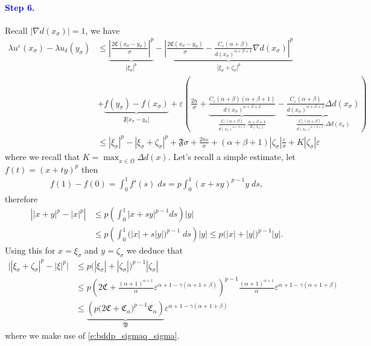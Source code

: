 \documentclass[11pt,reqno]{amsart}
\numberwithin{figure}{section}
\theoremstyle{plain}
\theoremstyle{remark}
\numberwithin{equation}{section}
\begin{document}
\paragraph{\textcolor{blue}{\textbf{Step 6.}}} Recall $|\nabla d(x_\sigma)| = 1$, we have
\begin{align}
    \lambda u^\varepsilon(x_\sigma) - \lambda u_\delta(y_\sigma) &\leq \underbrace{\left|\frac{2\mathfrak{C}(x_\sigma-y_\sigma)}{\sigma}\right|^p}_{|\xi_\sigma|^p} - \underbrace{ \left|\frac{2\mathfrak{C}(x_\sigma-y_\sigma)}{\sigma} - \frac{C_\varepsilon(\alpha+\beta)}{d(x_\sigma)^{\alpha+\beta+1}}\nabla d(x_\sigma )\right|^p}_{|\xi_\sigma+\zeta_\sigma|^p} \nonumber\\
    &+ \underbrace{f(y_\sigma) - f(x_\sigma)}_{\mathfrak{F}|x_\sigma - y_\sigma|} + \varepsilon\left(\frac{2n}{\sigma} + \underbrace{\frac{C_\varepsilon(\alpha+\beta)(\alpha+\beta+1)}{d(x_\sigma)^{\alpha+\beta+2}}}_{\frac{C_\varepsilon (\alpha+\beta)}{d(x_\sigma)^{\alpha+\beta + 1}}.\frac{\alpha+\beta+1}{d(x_\sigma)}}-\underbrace{\frac{C_\varepsilon(\alpha+\beta)}{d(x_\sigma)^{\alpha+\beta+1}}\Delta d(x_\sigma)}_{\frac{C_\varepsilon(\alpha+\beta)}{d(x_\sigma)^{\alpha+\beta+1}}.\Delta d(x_\sigma)}\right)\nonumber\\
    &\leq |\xi_\sigma|^p - |\xi_\sigma+\zeta_\sigma|^p + \mathfrak{F}\sigma + \frac{2n\varepsilon}{\sigma} + (\alpha+\beta+1)|\zeta_\sigma|\frac{\varepsilon}{\sigma} + K|\zeta_\sigma|\varepsilon \label{e:est3}
\end{align}
where we recall that $K = \max_{x\in \overline{\Omega}}\Delta d(x)$. Let's recall a simple estimate, let $f(t) = (x+ty)^p$ then
\begin{align*}
    f(1) - f(0) = \int_ 0^1 f'(s)\;ds = p\int_0^1 (x+sy)^{p-1}y\;ds,
\end{align*}
therefore
\begin{align*}
    \left||x+y|^p - |x|^p \right| &\leq p \left(\int_0^1 |x+sy|^{p-1}ds\right)|y|\\
    &\leq p\left(\int_0^1\Big(|x|+s|y|\Big)^{p-1}\;ds\right)|y| \leq  p\Big(|x|+|y|\Big)^{p-1}|y|.
\end{align*}
Using this for $x = \xi_\sigma$ and $y = \zeta_\sigma$ we deduce that
\begin{align}
    \Big||\xi_\sigma+\zeta_\sigma|^p - |\xi|^p\Big| &\leq p\Big(|\xi_\sigma|+|\zeta_\sigma|\Big)^{p-1}|\zeta_\sigma|\nonumber\\
    &\leq p\left(2\mathfrak{C} + \frac{(\alpha+1)^{\alpha+1}}{\alpha}\varepsilon^{\alpha+1 - \gamma(\alpha+1+\beta)}\right)^{p-1}\frac{(\alpha+1)^{\alpha+1}}{\alpha}\varepsilon^{\alpha+1 - \gamma(\alpha+1+\beta)}\nonumber\\
    &\leq \underbrace{\left(p\big(2\mathfrak{C} + \mathfrak{C}_\alpha\big)^{p-1} \mathfrak{C}_\alpha \right)}_{\mathfrak{B}}\varepsilon^{\alpha+1 - \gamma(\alpha+1+\beta)} \label{e:est2}
\end{align}
where we make use of \eqref{e:bddp_sigmaq_sigma}.
\end{document}
